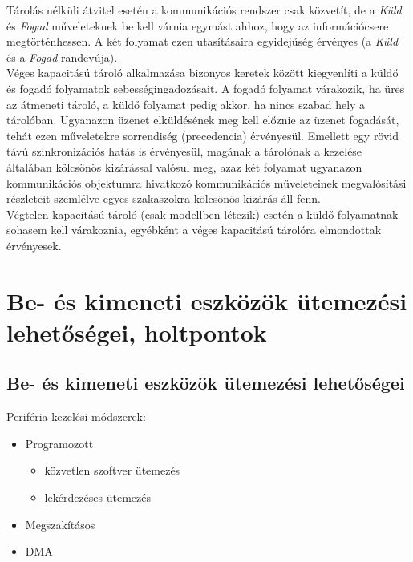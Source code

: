 \documentclass[tikz,12pt,margin=0px]{article}
\begin{document}
    \noindent Tárolás nélküli átvitel esetén a kommunikációs rendszer csak közvetít, de a \emph{Küld} és \emph{Fogad} műveleteknek be kell várnia egymást ahhoz, hogy az információcsere megtörténhessen. A két folyamat ezen utasításaira egyidejűség érvényes (a \emph{Küld} és a \emph{Fogad} randevúja).\\

    \noindent Véges kapacitású tároló alkalmazása bizonyos keretek között kiegyenlíti a küldő és fogadó folyamatok sebességingadozásait. A fogadó folyamat várakozik, ha üres az átmeneti tároló, a küldő folyamat pedig akkor, ha nincs szabad hely a tárolóban. Ugyanazon üzenet elküldésének meg kell előznie az üzenet fogadását, tehát ezen műveletekre sorrendiség (precedencia) érvényesül. Emellett egy rövid távú szinkronizációs hatás is érvényesül, magának a tárolónak a kezelése általában kölcsönös kizárással valósul meg, azaz két folyamat ugyanazon kommunikációs objektumra hivatkozó kommunikációs műveleteinek megvalósítási részleteit szemlélve egyes szakaszokra kölcsönös kizárás áll fenn.\\

    \noindent Végtelen kapacitású tároló (csak modellben létezik) esetén a küldő folyamatnak sohasem kell várakoznia, egyébként a véges kapacitású tárolóra elmondottak érvényesek.
	
	\section*{Be- és kimeneti eszközök ütemezési lehetőségei, holtpontok}
	
	\subsection*{Be- és kimeneti eszközök ütemezési lehetőségei\\}
	
    Periféria kezelési módszerek:
    \begin{itemize}[topsep=8pt,itemsep=4pt,partopsep=4pt, parsep=4pt]
        \item Programozott
        \begin{itemize}
          \item közvetlen szoftver ütemezés
          \item lekérdezéses ütemezés
        \end{itemize}
        \item Megszakításos
        \item DMA
    \end{itemize}
\end{document}
